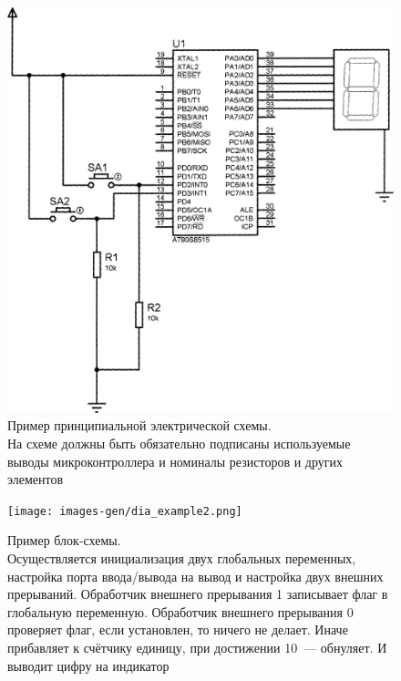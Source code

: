 \documentclass[main.tex]{subfiles}
\begin{document}
\begin{figure}[b]
\centering
\includegraphics[scale=0.18]{images/example1.png}
\caption{Пример принципиальной электрической схемы.\\ На схеме должны быть обязательно подписаны используемые выводы микроконтроллера и номиналы резисторов и других элементов}
\label{fig:example1}
\end{figure}

\begin{figure}[b]
\centering
\texttt{[image: images-gen/dia\_example2.png]}
\caption{Пример блок-схемы.\\ Осуществляется инициализация двух глобальных переменных, настройка порта ввода/вывода на вывод и настройка двух внешних прерываний. Обработчик внешнего прерывания 1 записывает флаг в глобальную переменную. Обработчик внешнего прерывания 0 проверяет флаг, если установлен, то ничего не делает. Иначе прибавляет к счётчику единицу, при достижении 10~--- обнуляет. И выводит цифру на индикатор}
\label{fig:example2}
\end{figure}
\end{document}
